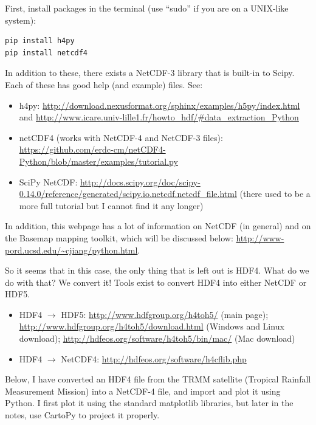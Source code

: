 \documentclass[a4paper,10pt]{scrartcl}
\begin{document}
First, install packages in the terminal (use ``sudo'' if you are on a UNIX-like system):
\begin{lstlisting}
pip install h4py
pip install netcdf4
\end{lstlisting}
In addition to these, there exists a NetCDF-3 library that is built-in to Scipy. Each of these has good help (and example) files. See:
\begin{itemize}
 \item h4py: \url{http://download.nexusformat.org/sphinx/examples/h5py/index.html} and \url{http://www.icare.univ-lille1.fr/howto_hdf/#data_extraction_Python}
 \item netCDF4 (works with NetCDF-4 and NetCDF-3 files): \url{https://github.com/erdc-cm/netCDF4-Python/blob/master/examples/tutorial.py}
 \item SciPy NetCDF: \url{http://docs.scipy.org/doc/scipy-0.14.0/reference/generated/scipy.io.netcdf.netcdf_file.html} (there used to be a more full tutorial but I cannot find it any longer)
\end{itemize}
In addition, this webpage has a lot of information on NetCDF (in general) and on the Basemap mapping toolkit, which will be discussed below: \url{http://www-pord.ucsd.edu/~cjiang/python.html}.

So it seems that in this case, the only thing that is left out is HDF4. What do we do with that? We convert it! Tools exist to convert HDF4 into either NetCDF or HDF5.
\begin{itemize}
 \item HDF4 $\rightarrow$ HDF5: \url{http://www.hdfgroup.org/h4toh5/} (main page); \url{http://www.hdfgroup.org/h4toh5/download.html} (Windows and Linux download); \url{http://hdfeos.org/software/h4toh5/bin/mac/} (Mac download)
 \item HDF4 $\rightarrow$ NetCDF4: \url{http://hdfeos.org/software/h4cflib.php}
\end{itemize}

Below, I have converted an HDF4 file from the TRMM satellite (Tropical Rainfall Measurement Mission) into a NetCDF-4 file, and import and plot it using Python. I first plot it using the standard matplotlib libraries, but later in the notes, use CartoPy to project it properly.


\end{document}
